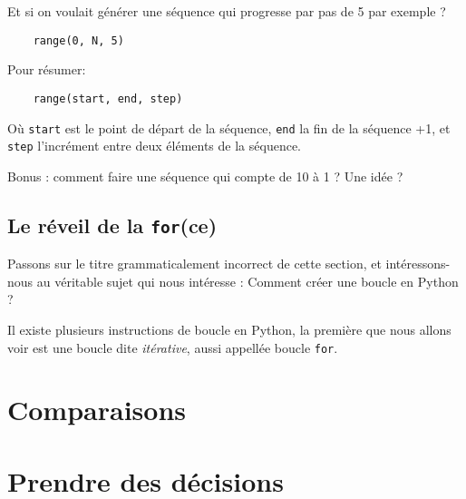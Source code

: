 Et si on voulait générer une séquence qui progresse par pas de 5 par exemple ?

\begin{lstlisting}
    range(0, N, 5)
\end{lstlisting}

Pour résumer:

\begin{lstlisting}
    range(start, end, step)
\end{lstlisting}

Où \texttt{start} est le point de départ de la séquence, \texttt{end} la fin de la séquence +1, et \texttt{step} l'incrément entre deux éléments de la séquence.

Bonus : comment faire une séquence qui compte de 10 à 1 ? Une idée ?

\subsection{Le réveil de la \texttt{for}(ce)}

Passons sur le titre grammaticalement incorrect de cette section, et intéressons-nous au véritable sujet qui nous intéresse : Comment créer une boucle en Python ?

Il existe plusieurs instructions de boucle en Python, la première que nous allons voir est une boucle dite \emph{itérative}, aussi appellée boucle \texttt{for}. 

\section{Comparaisons}

\section{Prendre des décisions}
